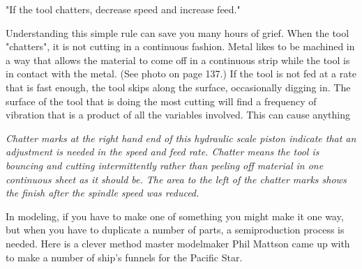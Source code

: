 \begin{framed}
"If the tool chatters, decrease speed and increase feed."
\end{framed}

Understanding this simple rule can save you many hours of grief. When the tool
"chatters", it is not cutting in a continuous fashion. Metal likes to be
machined in a way that allows the material to come off in a continuous strip
while the tool is in contact with the metal. (See photo on page 137.) If the
tool is not fed at a rate that is fast enough, the tool skips along the surface,
occasionally digging in. The surface of the tool that is doing the most cutting
will find a frequency of vibration that is a product of all the variables
involved. This can cause anything

\bigskip
\textit{Chatter marks at the right hand end of this hydraulic scale piston
indicate that an adjustment is needed in the speed and feed rate. Chatter means
the tool is bouncing and cutting intermittently rather than peeling off material
in one continuous sheet as it should be. The area to the left of the chatter
marks shows the finish after the spindle speed was reduced.}
\bigskip

\secup

\secdown


In modeling, if you have to make one of something you might make it one way, but
when you have to duplicate a number of parts, a semiproduction process is
needed. Here is a clever method master modelmaker Phil Mattson came up with to
make a number of ship's funnels for the Pacific Star.


